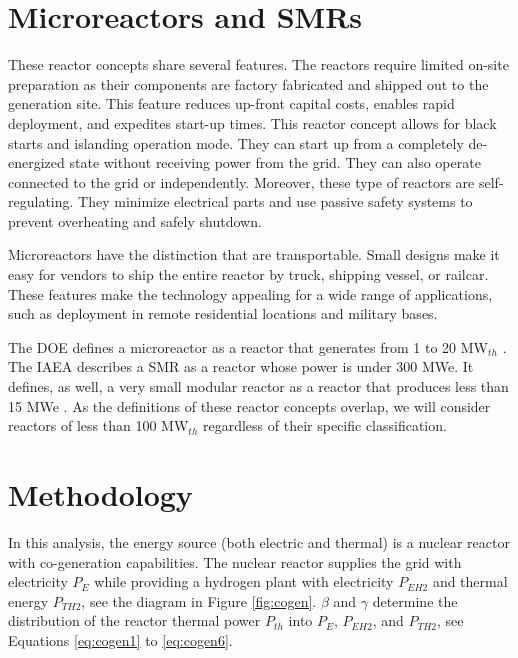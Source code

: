 \documentclass[11pt,letterpaper]{article}
\begin{document}
\section{Microreactors and \glspl{SMR}}
\label{sec:reactors}

These reactor concepts share several features.
The reactors require limited on-site preparation as their components are factory fabricated and shipped out to the generation site.
This feature reduces up-front capital costs, enables rapid deployment, and expedites start-up times.
This reactor concept allows for black starts and islanding operation mode.
They can start up from a completely de-energized state without receiving power from the grid.
They can also operate connected to the grid or independently.
Moreover, these type of reactors are self-regulating.
They minimize electrical parts and use passive safety systems to prevent overheating and safely shutdown.

Microreactors have the distinction that are transportable.
Small designs make it easy for vendors to ship the entire reactor by truck, shipping vessel, or railcar.
These features make the technology appealing for a wide range of applications, such as deployment in remote residential locations and military bases.

The \gls{DOE} defines a microreactor as a reactor that generates from 1 to 20 MW$_{th}$ \cite{us-doe_ultimate_2019}.
The \gls{IAEA} describes a \gls{SMR} as a reactor whose power is under 300 MWe.
It defines, as well, a very small modular reactor as a reactor that produces less than 15 MWe \cite{world_nuclear_association_small_2020}.
As the definitions of these reactor concepts overlap, we will consider reactors of less than 100 MW$_{th}$ regardless of their specific classification.

\section{Methodology}
\label{sec:metho}

In this analysis, the energy source (both electric and thermal) is a nuclear reactor with co-generation capabilities.
The nuclear reactor supplies the grid with electricity $P_E$ while providing a hydrogen plant with electricity $P_{EH2}$ and thermal energy $P_{TH2}$, see the diagram in Figure \ref{fig:cogen}.
$\beta$ and $\gamma$ determine the distribution of the reactor thermal power $P_{th}$ into $P_E$, $P_{EH2}$, and $P_{TH2}$, see Equations \ref{eq:cogen1} to \ref{eq:cogen6}.
\end{document}
